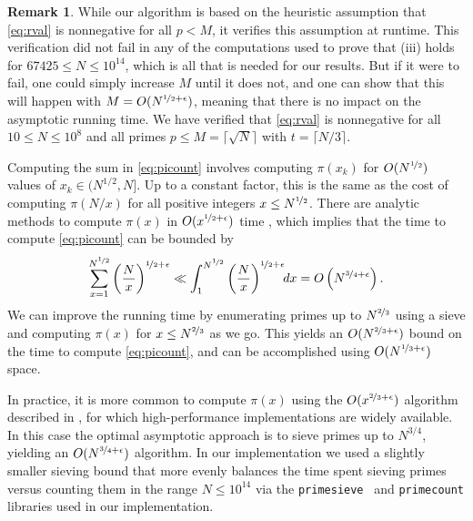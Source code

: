 \documentclass[10pt,a4paper,reqno]{amsart}
\numberwithin{equation}{section}
\theoremstyle{plain}
\theoremstyle{definition}
\newtheorem{remark}[theorem]{Remark}
\begin{document}
\begin{remark} While our algorithm is based on the heuristic assumption that \eqref{eq:rval} is nonnegative for all $p<M$, it verifies this assumption at runtime. This verification did not fail in any of the computations used to prove that (iii) holds for $67425\le N\le 10^{14}$, which is all that is needed for our results.  But if it were to fail, one could simply increase $M$ until it does not, and one can show that this will happen with $M=O(N^{\nicefrac{1}{2}+\epsilon})$, meaning that there is no impact on the asymptotic running time.  We have verified that \eqref{eq:rval} is nonnegative for all $10\le N\le 10^8$ and all primes $p \le M=\lceil\sqrt{N}\rceil$ with $t=\lceil N/3\rceil$.
\end{remark}

Computing the sum in \eqref{eq:picount} involves computing $\pi(x_k)$ for $O(N^{\nicefrac{1}{2}})$ values of $x_k\in (N^{1/2},N]$.
Up to a constant factor, this is the same as the cost of computing $\pi(N/x)$ for all positive integers $x \le N^{\nicefrac{1}{2}}$.
There are analytic methods to compute $\pi(x)$ in $O(x^{\nicefrac{1}{2}+\epsilon})$ time \cite{lagarias-odlyzko}, which implies that the time to compute \eqref{eq:picount} can be bounded by
\[
\sum_{x=1}^{N^{\nicefrac{1}{2}}} \left(\frac{N}{x}\right)^{\nicefrac{1}{2}+\epsilon} \ll \int_1^{N^{\nicefrac{1}{2}}} \left(\frac{N}{x}\right)^{\nicefrac{1}{2}+\epsilon}\!\! dx = O\left(N^{\nicefrac{3}{4}+\epsilon}\right).
\]
We can improve the running time by enumerating primes up to $N^{\nicefrac{2}{3}}$ using a sieve and computing $\pi(x)$ for $x\le N^{\nicefrac{2}{3}}$ as we go.  This yields an $O(N^{\nicefrac{2}{3}+\epsilon})$ bound on the time to compute \eqref{eq:picount}, and can be accomplished using $O(N^{\nicefrac{1}{3}+\epsilon})$ space.

In practice, it is more common to compute $\pi(x)$ using the $O(x^{\nicefrac{2}{3}+\epsilon})$ algorithm described in \cite{deleglise-rivat,lagarias-miller-odlyzko}, for which high-performance implementations are widely available.  In this case the optimal asymptotic approach is to sieve primes up to $N^{3/4}$, yielding an $O(N^{\nicefrac{3}{4}+\epsilon})$ algorithm. In our implementation we used a  slightly smaller sieving bound that more evenly balances the time spent sieving primes versus counting them in the range $N\le 10^{14}$ via the \texttt{primesieve}~\cite{walisch-primesieve} and \texttt{primecount} \cite{walisch-primecount} libraries used in our implementation.
\end{document}
